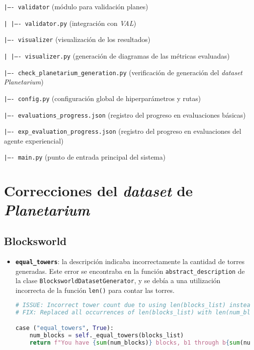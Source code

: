 \begin{anexes}
\texttt{|---- validator} (módulo para validación planes)

\texttt{|   |---- validator.py} (integración con \textit{VAL})

\texttt{|---- visualizer} (visualización de los resultados)

\texttt{|   |---- visualizer.py} (generación de diagramas de las métricas evaluadas)

\texttt{|---- check\_planetarium\_generation.py} (verificación de generación del \textit{dataset Planetarium})

\texttt{|---- config.py} (configuración global de hiperparámetros y rutas)

\texttt{|---- evaluations\_progress.json} (registro del progreso en evaluaciones básicas)

\texttt{|---- exp\_evaluation\_progress.json} (registro del progreso en evaluaciones del agente experiencial)

\texttt{|---- main.py} (punto de entrada principal del sistema)

\section*{Correcciones del \textit{dataset} de \textit{Planetarium}}

\subsection*{Blocksworld}

\begin{itemize}
    \item \textbf{\texttt{equal\_towers}}: la descripción indicaba incorrectamente la cantidad de torres generadas. Este error se encontraba en la función \texttt{abstract\_description} de la clase \texttt{BlocksworldDatasetGenerator}, y se debía a una utilización incorrecta de la función \texttt{len()} para contar las torres.

\begin{lstlisting}[language=Python, caption={Corrección de \texttt{equal\_towers} dentro de \texttt{BlocksworldDatasetGenerator.abstract\_description}}, label={lst:equal_towers_fix}, basicstyle=\ttfamily\small, frame=single]
# ISSUE: Incorrect tower count due to using len(blocks_list) instead of len(num_blocks).
# FIX: Replaced all occurrences of len(blocks_list) with len(num_blocks).

case ("equal_towers", True):
    num_blocks = self._equal_towers(blocks_list)
    return f"You have {sum(num_blocks)} blocks, b1 through b{sum(num_blocks)}, stacked into {len(num_blocks)} towers of equal heights, and your arm is empty."


\end{lstlisting}
\end{itemize}
\end{anexes}
